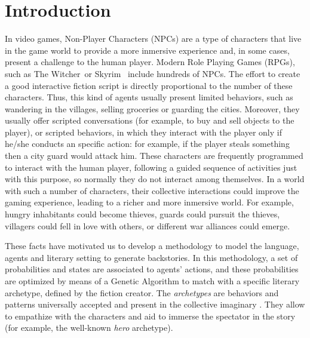 \documentclass{sig-alternate}
\begin{document}






%
%
\section{Introduction}
\label{sec:intro}

In video games, Non-Player Characters (NPCs)  are a type of characters
that live in the game world to provide a more inmersive
experience and, in some cases, present a challenge to the human player. Modern  Role Playing Games (RPGs), such as The
Witcher\texttrademark~or Skyrim\texttrademark~ include hundreds of NPCs. The effort to create a good interactive fiction script is directly proportional to the number of these characters. Thus, this kind of agents usually present limited behaviors, such as wandering in the villages, selling groceries or guarding the cities. Moreover, they usually offer scripted conversations (for example, to buy and sell objects to the player), or scripted behaviors, in which they interact with the player only if he/she conducts an specific action: for example, if the player steals something then a city guard would attack him. These characters are frequently programmed to interact with the human player, following a guided sequence of activities just with this purpose, so normally they do not interact among themselves. In a world with such a number of characters, their collective interactions could improve the gaming experience, leading to a richer and more inmersive world. For example, hungry inhabitants could become thieves, guards could pursuit the thieves, villagers could fell in love with others, or different war alliances could emerge.


These facts have motivated us to develop a methodology to model the language, agents and literary setting to generate backstories. In this methodology, a set of probabilities and 
states are associated to agents' actions, and these probabilities are
optimized by means of a Genetic Algorithm to match with a
specific literary archetype, defined by the fiction creator. The {\em
archetypes} are behaviors and patterns universally accepted and
present in the collective imaginary
 \cite{ArchetypesGarry05}. They allow to empathize  %
with the characters and aid to immerse the spectator in the story
(for example, the well-known {\em hero} archetype).
\end{document}
